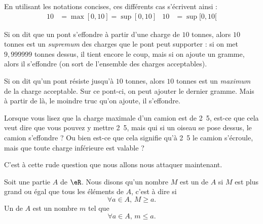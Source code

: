 En utilisant les notations concises, ces différents cas s'écrivent ainsi :
\begin{align*}
10&=\max[0,10]=\sup[0,10]	& 10&=\sup[0,10[
\end{align*}


\begin{example}
Si on dit que un pont s'effondre à partir d'une charge de $10$ tonnes, alors $10$ tonnes est un \emph{supremum} des charges que le pont peut supporter : si on met $9,999999$ tonnes dessus, il tient encore le coup, mais si on ajoute un gramme, alors il s'effondre (on sort de l'ensemble des charges acceptables).
\end{example}

\begin{example}
Si on dit qu'un pont résiste jusqu'à $10$ tonnes, alors $10$ tonnes est un \emph{maximum} de la charge acceptable. Sur ce pont-ci, on peut ajouter le dernier gramme. Mais à partir de là, le moindre truc qu'on ajoute, il s'effondre.
\end{example}

Lorsque vous lisez que la charge maximale d'un camion est de \unit{2.5}{\ton}, est-ce que cela veut dire que vous pouvez y mettre \unit{2.5}{\ton}, mais qui si un oiseau se pose dessus, le camion s'effondre ? Ou bien est-ce que cela signifie qu'à \unit{2.5}{\ton} le camion s'écroule, mais que toute charge inférieure est valable ?

C'est à cette rude question que nous allons nous attaquer maintenant.

\begin{definition}
Soit une partie $A$ de $\eR$. Nous disons qu'un nombre $M$ est un  de $A$ si $M$ est plus grand ou égal que tous les éléments de $A$, c'est à dire si
\begin{equation}
	\forall a\in A,\, M\geq a.
\end{equation}
Un  de $A$ est un nombre $m$ tel que 
\begin{equation}
	\forall a\in A,\, m\leq a.
\end{equation}
\end{definition}


